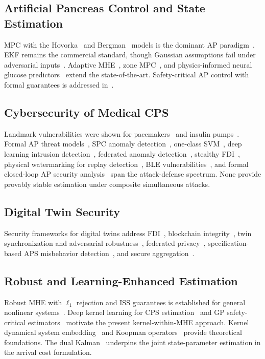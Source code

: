 \documentclass[journal,twoside]{IEEEtran}
\begin{document}
\subsection{Artificial Pancreas Control and State Estimation}
MPC with the Hovorka~\cite{hovorka2004} and Bergman~\cite{bergman1981} models is
the dominant AP paradigm~\cite{magni2008}. EKF remains the commercial standard,
though Gaussian assumptions fail under adversarial inputs~\cite{patek2012}. Adaptive
MHE~\cite{chakrabarty2018,messori2019}, zone MPC~\cite{dassau2013}, and
physics-informed neural glucose predictors~\cite{shi2023,rodriguez2023} extend the
state-of-the-art. Safety-critical AP control with formal guarantees is addressed
in~\cite{farina2021}.

\subsection{Cybersecurity of Medical CPS}
Landmark vulnerabilities were shown for pacemakers~\cite{halperin2008} and insulin
pumps~\cite{radcliffe2011}. Formal AP threat models~\cite{sevil2020,li2020}, SPC
anomaly detection~\cite{datta2019}, one-class SVM~\cite{sevil2021}, deep learning
intrusion detection~\cite{xiao2022}, federated anomaly detection~\cite{ali2023},
stealthy FDI~\cite{sevil2021}, physical watermarking for replay detection~\cite{mo2015watermark}, BLE
vulnerabilities~\cite{rushanan2014}, and formal closed-loop AP security
analysis~\cite{kim2023apsec} span the attack-defense spectrum. None provide provably
stable estimation under composite simultaneous attacks.

\subsection{Digital Twin Security}
Security frameworks for digital twins address FDI~\cite{mo2015},
blockchain integrity~\cite{xu2022}, twin synchronization and adversarial robustness~\cite{lopez2022},
federated privacy~\cite{li2021fedbn}, specification-based APS misbehavior detection~\cite{astillo2021}, and secure
aggregation~\cite{bonawitz2017}.

\subsection{Robust and Learning-Enhanced Estimation}
Robust MHE with $\ell_1$ rejection and ISS guarantees is established for general
nonlinear systems~\cite{rao2003,alessandri2008}. Deep kernel learning for CPS
estimation~\cite{lederer2021,chen2023} and GP safety-critical
estimators~\cite{umlauft2018} motivate the present kernel-within-MHE approach.
Kernel dynamical system embedding~\cite{scholkopf1997} and Koopman
operators~\cite{korda2018} provide theoretical foundations. The dual
Kalman~\cite{wan2001} underpins the joint state-parameter estimation in the
arrival cost formulation.
\end{document}
